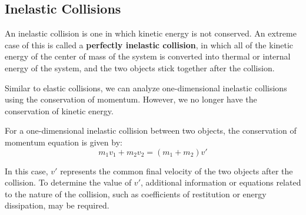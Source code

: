 \documentclass[11pt]{article}
\begin{document}
\subsection{Inelastic Collisions}
An inelastic collision is one in which kinetic energy is not conserved. An extreme case of this is called a \textbf{perfectly inelastic collision}, in which all of the kinetic energy of the center of mass of the system is converted into thermal or internal energy of the system, and the two objects stick together after the collision.

Similar to elastic collisions, we can analyze one-dimensional inelastic collisions using the conservation of momentum. However, we no longer have the conservation of kinetic energy.

For a one-dimensional inelastic collision between two objects, the conservation of momentum equation is given by:
\[
m_1v_1 + m_2v_2 = (m_1 + m_2)v'
\]

In this case, $v'$ represents the common final velocity of the two objects after the collision. To determine the value of $v'$, additional information or equations related to the nature of the collision, such as coefficients of restitution or energy dissipation, may be required.
\end{document}
